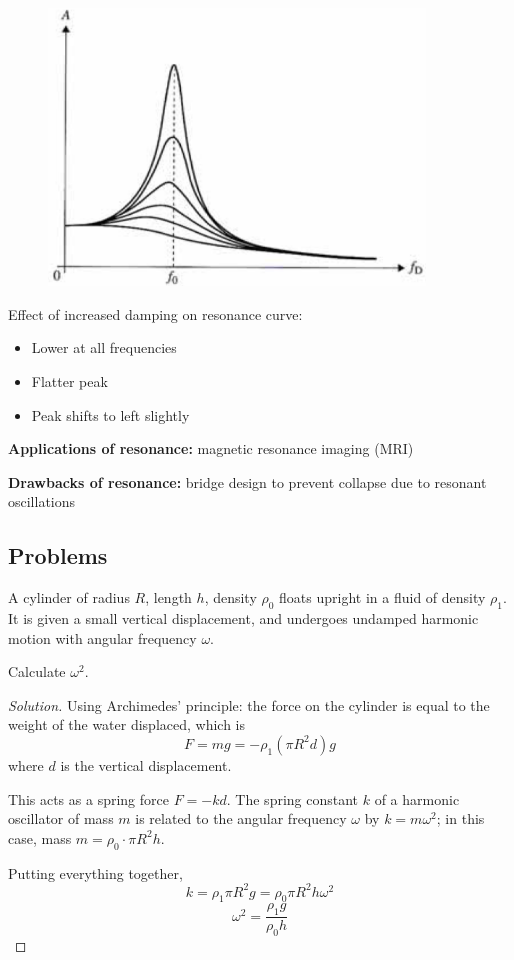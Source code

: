 \begin{figure}[H]
    \centering
    \includegraphics[width=10cm]{images/Amptlitude_forced_oscillation.png}
\end{figure}

Effect of increased damping on resonance curve:
\begin{itemize}
\item Lower at all frequencies
\item Flatter peak
\item Peak shifts to left slightly
\end{itemize}

\textbf{Applications of resonance:} magnetic resonance imaging (MRI)

\textbf{Drawbacks of resonance:} bridge design to prevent collapse due to resonant oscillations
\pagebreak

\subsection*{Problems}
\begin{prbm}
A cylinder of radius $R$, length $h$, density $\rho_0$ floats upright in a fluid of density $\rho_1$. It is given a small vertical displacement, and undergoes undamped harmonic motion with angular frequency $\omega$. 

Calculate $\omega^2$.
\end{prbm}

\begin{proof}[Solution]
Using Archimedes’ principle: the force on the cylinder is equal to the weight of the water displaced, which is
\[ F = mg = -\rho_1 (\pi R^2 d)g \]
where $d$ is the vertical displacement. 

This acts as a spring force $F=-kd$. The spring constant $k$ of a harmonic oscillator of mass $m$ is related to the angular frequency $\omega$ by $k=m\omega^2$; in this case, mass $m=\rho_0 \cdot \pi R^2h$.

Putting everything together, 
\[ k=\rho_1\pi R^2 g = \rho_0\pi R^2 h\omega^2 \]
\[ \boxed{\omega^2=\frac{\rho_1g}{\rho_0h}} \]
\end{proof}
\pagebreak

